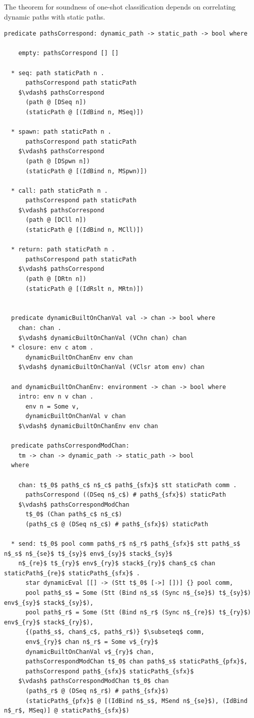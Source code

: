 \documentclass[letterpaper, 11pt]{extarticle}
\begin{document}
The theorem for soundness of one-shot classification depends on
correlating dynamic paths with static paths.

\begin{lstlisting}[language=logic, mathescape]
  predicate pathsCorrespond: dynamic_path -> static_path -> bool where

    empty: pathsCorrespond [] []

  * seq: path staticPath n .
      pathsCorrespond path staticPath
    $\vdash$ pathsCorrespond
      (path @ [DSeq n])
      (staticPath @ [(IdBind n, MSeq)])

  * spawn: path staticPath n .
      pathsCorrespond path staticPath
    $\vdash$ pathsCorrespond
      (path @ [DSpwn n])
      (staticPath @ [(IdBind n, MSpwn)])

  * call: path staticPath n .
      pathsCorrespond path staticPath
    $\vdash$ pathsCorrespond
      (path @ [DCll n])
      (staticPath @ [(IdBind n, MCll)])

  * return: path staticPath n .
      pathsCorrespond path staticPath
    $\vdash$ pathsCorrespond
      (path @ [DRtn n])
      (staticPath @ [(IdRslt n, MRtn)])


  predicate dynamicBuiltOnChanVal val -> chan -> bool where
    chan: chan .
    $\vdash$ dynamicBuiltOnChanVal (VChn chan) chan
  * closure: env c atom .
      dynamicBuiltOnChanEnv env chan
    $\vdash$ dynamicBuiltOnChanVal (VClsr atom env) chan

  and dynamicBuiltOnChanEnv: environment -> chan -> bool where
    intro: env n v chan . 
      env n = Some v,
      dynamicBuiltOnChanVal v chan
    $\vdash$ dynamicBuiltOnChanEnv env chan

  predicate pathsCorrespondModChan:
    tm -> chan -> dynamic_path -> static_path -> bool
  where

    chan: t$_0$ path$_c$ n$_c$ path$_{sfx}$ stt staticPath comm .
      pathsCorrespond ((DSeq n$_c$) # path$_{sfx}$) staticPath
    $\vdash$ pathsCorrespondModChan
      t$_0$ (Chan path$_c$ n$_c$)
      (path$_c$ @ (DSeq n$_c$) # path$_{sfx}$) staticPath

  * send: t$_0$ pool comm path$_r$ n$_r$ path$_{sfx}$ stt path$_s$ n$_s$ n$_{se}$ t$_{sy}$ env$_{sy}$ stack$_{sy}$
    n$_{re}$ t$_{ry}$ env$_{ry}$ stack$_{ry}$ chan$_c$ chan staticPath$_{re}$ staticPath$_{sfx}$ . 
      star dynamicEval [[] -> (Stt t$_0$ [->] [])] {} pool comm,
      pool path$_s$ = Some (Stt (Bind n$_s$ (Sync n$_{se}$) t$_{sy}$) env$_{sy}$ stack$_{sy}$),
      pool path$_r$ = Some (Stt (Bind n$_r$ (Sync n$_{re}$) t$_{ry}$) env$_{ry}$ stack$_{ry}$),
      {(path$_s$, chan$_c$, path$_r$)} $\subseteq$ comm, 
      env$_{ry}$ chan n$_r$ = Some v$_{ry}$
      dynamicBuiltOnChanVal v$_{ry}$ chan, 
      pathsCorrespondModChan t$_0$ chan path$_s$ staticPath$_{pfx}$,
      pathsCorrespond path$_{sfx}$ staticPath$_{sfx}$
    $\vdash$ pathsCorrespondModChan t$_0$ chan
      (path$_r$ @ (DSeq n$_r$) # path$_{sfx}$)
      (staticPath$_{pfx}$ @ [(IdBind n$_s$, MSend n$_{se}$), (IdBind n$_r$, MSeq)] @ staticPath$_{sfx}$)
\end{lstlisting}
\end{document}

